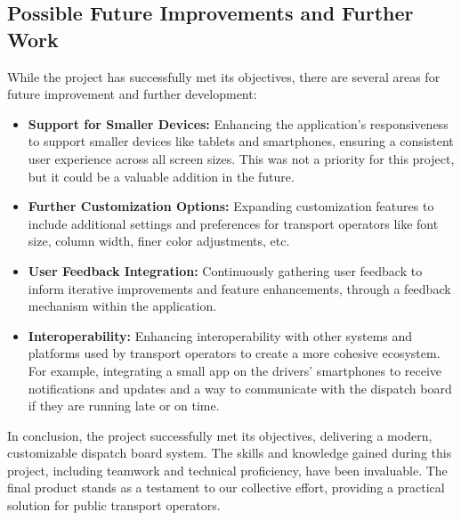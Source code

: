 \documentclass[10pt]{article}
\begin{document}
         \subsection{Possible Future Improvements and Further Work}

         While the project has successfully met its objectives, there are several areas for future improvement and further development:
         
         \begin{itemize}
             \item \textbf {Support for Smaller Devices:} Enhancing the application's responsiveness to support smaller devices like tablets and smartphones, ensuring a consistent user experience across all screen sizes. This was not a priority for this project, but it could be a valuable addition in the future.
             \item \textbf{Further Customization Options:} Expanding customization features to include additional settings and preferences for transport operators like font size, column width, finer color adjustments, etc.
             \item \textbf{User Feedback Integration:} Continuously gathering user feedback to inform iterative improvements and feature enhancements, through a feedback mechanism within the application.
             \item \textbf{Interoperability:} Enhancing interoperability with other systems and platforms used by transport operators to create a more cohesive ecosystem. For example, integrating a small app on the drivers' smartphones to receive notifications and updates and a way to communicate with the dispatch board if they are running late or on time.
         \end{itemize}
         
         In conclusion, the project successfully met its objectives, delivering a modern, customizable dispatch board system. The skills and knowledge gained during this project, including teamwork and technical proficiency, have been invaluable. The final product stands as a testament to our collective effort, providing a practical solution for public transport operators.        


        

        
\end{document}
